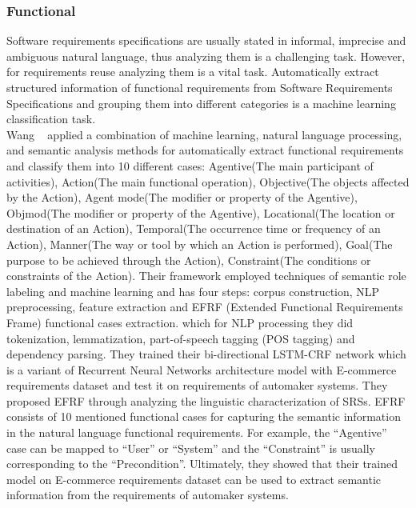 \subsubsection{Functional}

Software requirements specifications are usually stated in informal, imprecise and ambiguous natural language, thus analyzing them is a challenging task. However, for requirements reuse analyzing them is a vital task. Automatically extract structured information of functional requirements from Software Requirements Specifications and grouping them into different categories is a machine learning classification task\cite{7949577}. \\ 

Wang \etal~\cite{7949577} applied a combination of machine learning, natural language processing, and semantic analysis methods for automatically extract functional requirements and classify them into 10 different cases: Agentive(The main participant of activities), Action(The main functional operation), Objective(The objects affected by the Action), Agent mode(The modifier or property of the Agentive), Objmod(The modifier or property of the Agentive), Locational(The location or destination of an Action), Temporal(The occurrence time or frequency of an Action), Manner(The way or tool by which an Action is performed), Goal(The purpose to be achieved through the Action), Constraint(The conditions or constraints of the Action). Their framework employed techniques of semantic role labeling and machine learning and has four steps: corpus construction, NLP preprocessing, feature extraction and  EFRF (Extended Functional Requirements Frame) functional cases extraction. which for NLP processing they did tokenization, lemmatization, part-of-speech tagging (POS  tagging) and dependency parsing. They trained their bi-directional LSTM-CRF network which is a variant of Recurrent Neural Networks architecture model with E-commerce requirements dataset and test it on requirements of automaker systems. They proposed EFRF through analyzing the linguistic characterization of SRSs. EFRF consists of 10 mentioned functional cases for capturing the semantic information in the natural language functional requirements. For example, the “Agentive” case can be mapped to “User” or “System” and the “Constraint” is usually corresponding to the “Precondition”. Ultimately, they showed that their trained model on E-commerce requirements dataset can be used to extract semantic information from the requirements of automaker systems.

